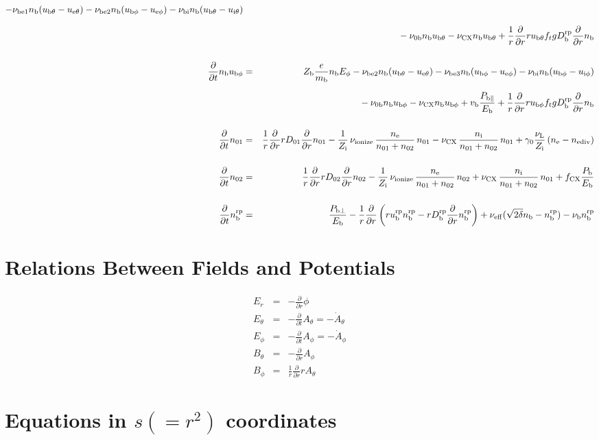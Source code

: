 \documentclass[11pt]{article}
\def\r#1{{\rm#1}}
\def\ddt{\frac{\partial}{\partial t}}
\def\ddr{\frac{\partial}{\partial r}}
\def\mb{m_\r{b}}
\def\ne{n_\r{e}}
\def\ni{n_\r{i}}
\def\nb{n_\r{b}}
\def\ueth{u_{\r{e}\theta}}
\def\uith{u_{\r{i}\theta}}
\def\ubth{u_{\r{b}\theta}}
\def\ueph{u_{\r{e}\phi}}
\def\uiph{u_{\r{i}\phi}}
\def\ubph{u_{\r{b}\phi}}
\def\Er{E_r}
\def\Eth{E_\theta}
\def\Eph{E_\phi}
\def\Bth{B_\theta}
\def\Bph{B_\phi}
\def\Athd{\dot{A}_\theta}
\def\Aphd{\dot{A}_\phi}
\def\Ath{A_\theta}
\def\Aph{A_\phi}
\def\nna{n_{01}}
\def\nnb{n_{02}}
\def\Zi{Z_\r{i}}
\def\Zb{Z_\r{b}}
\def\Pb{P_\r{b}}
\def\Eb{E_\r{b}}
\def\nbrp{n_\r{b}^\r{rp}}
\def\Pbpara{P_{\r{b}\parallel}}
\def\Pbperp{P_{\r{b}\perp}}
\def\nueff{\nu_\r{eff}}
\def\ubrp{u_\r{b}^\r{rp}}
\def\Dbrp{D_\r{b}^\r{rp}}
\def\fCX{f_\r{CX}}
\def\nuNCi{\nu_\r{NCi}}
\def\nubi{\nu_\r{bi}}
\def\nunb{\nu_\r{0b}}
\def\nuL{\nu_\r{L}}
\def\nuCX{\nu_\r{CX}}
\def\nuion{\nu_\r{ionize}}
\def\nub{\nu_\r{b}}
\def\vb{v_\r{b}}
\def\nediv{n_\r{ediv}}
\begin{document}
\begin{eqnarray}
%
%
  - \nu_\r{be1} \nb (\ubth - \ueth)
%
  - \nu_\r{be2} \nb (\ubph - \ueph)
%
  - \nubi \nb (\ubth - \uith)
\nonumber\\[2.5mm]&&{}
%
  - \nunb \nb \ubth
%
  - \nuCX \nb \ubth
%
  + \frac{1}{r} \ddr r \ubth f_t g \Dbrp \ddr \nb
\\[5mm]
%
%
  \ddt \nb \ubph &=&
%
  \Zb \frac{e}{\mb} \nb \Eph
%
  - \nu_\r{be2} \nb (\ubth - \ueth)
%
  - \nu_\r{be3} \nb (\ubph - \ueph)
%
  - \nubi \nb (\ubph - \uiph)
\nonumber\\[2.5mm]&&{}
%
  - \nunb \nb \ubph
%
  - \nuCX \nb \ubph
%
  + \vb \frac{\Pbpara}{\Eb}
%
  + \frac{1}{r} \ddr r \ubph f_t g \Dbrp \ddr \nb
\\[5mm]
%
%
  \ddt \nna &=& 
%
    \frac{1}{r} \ddr r D_{01} \ddr \nna
%
  - \frac{1}{\Zi}\, \nuion\, \frac{\ne}{\nna+\nnb}\, \nna
%
  - \nuCX\, \frac{\ni}{\nna+\nnb}\, \nna
%
  + \gamma_0 \frac{\nuL}{\Zi} \, (\ne - \nediv)
\\[5mm]
%
%
  \ddt \nnb &=& 
%
    \frac{1}{r} \ddr r D_{02} \ddr \nnb
%
  - \frac{1}{\Zi}\, \nuion\, \frac{\ne}{\nna+\nnb}\, \nnb
%
  + \nuCX\, \frac{\ni}{\nna+\nnb}\, \nna
%
  + \fCX \frac{\Pb}{\Eb}
\\[5mm]
%
%
  \ddt \nbrp &=&
%
    \frac{\Pbperp}{\Eb}
%
  - \frac{1}{r} \ddr \left( r \ubrp \nbrp - r \Dbrp \ddr \nbrp \right)
%
  + \nueff (\sqrt{2\delta} \nb - \nbrp)
%
  - \nub \nbrp
%
\end{eqnarray}

\bigskip

\section{Relations Between Fields and Potentials}
\setcounter{equation}{0}

\begin{eqnarray}
%
%
  \Er &=&
%
  - \ddr \phi
\\[5mm]
%
%
  \Eth &=&
%
  - \ddt \Ath = - \Athd
\\[5mm]
%
%
  \Eph &=&
%
  - \ddt \Aph = - \Aphd
\\[5mm]
%
%
  \Bth &=&
%
  - \ddr \Aph
\\[5mm]
%
%
  \Bph &=&
%
  \frac{1}{r} \ddr r \Ath
\end{eqnarray}

\bigskip

\section{Equations in $s(=r^2)$ coordinates}
\setcounter{equation}{0}
\end{document}
